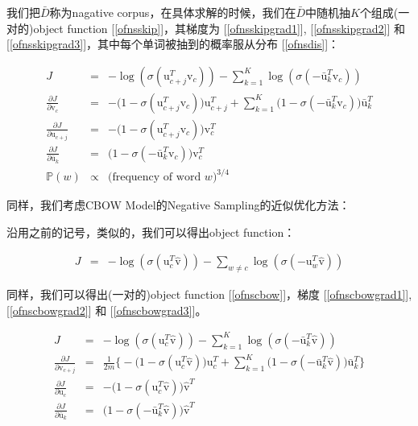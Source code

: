 \documentclass{article}
\begin{document}
我们把$\bar{D}$称为nagative corpus，在具体求解的时候，我们在$\bar{D}$中随机抽$K$个组成(一对的)object function [\ref{ofnsskip}]，其梯度为 [\ref{ofnsskipgrad1}], [\ref{ofnsskipgrad2}] 和 [\ref{ofnsskipgrad3}]，其中每个单词被抽到的概率服从分布 [\ref{ofnsdis}]：

\begin{eqnarray}
\label{ofnsskip}
J &=& -\log(\sigma(\mathrm{u}_{c+j}^T\mathrm{v}_c)) - \sum_{k=1}^K{\log(\sigma(-\bar{\mathrm{u}}_k^T\mathrm{v}_c))}\\
\label{ofnsskipgrad1}
\frac{\partial J}{\partial \mathrm{v}_c} &=& -\big(1-\sigma(\mathrm{u}_{c+j}^T\mathrm{v}_c)\big)\mathrm{u}_{c+j}^T + \sum_{k=1}^K{\big(1-\sigma(-\bar{\mathrm{u}}_k^T\mathrm{v}_c)\big)\bar{\mathrm{u}}_k^T} \\
\label{ofnsskipgrad2}
\frac{\partial J}{\partial \mathrm{u}_{c+j}} &=& -\big(1-\sigma(\mathrm{u}_{c+j}^T\mathrm{v}_c)\big)\mathrm{v}_{c}^T \\
\label{ofnsskipgrad3}
\frac{\partial J}{\partial \bar{\mathrm{u}}_k} &=& \big(1-\sigma(-\bar{\mathrm{u}}_k^T\mathrm{v}_c)\big)\mathrm{v}_{c}^T \\
\label{ofnsdis}
\mathbb{P}(w) &\propto& \big(\text{frequency of word $w$}\big)^{3/4}
\end{eqnarray}

同样，我们考虑CBOW Model的Negative Sampling的近似优化方法：

沿用之前的记号，类似的，我们可以得出object function：

\begin{eqnarray}
J &=& -\log(\sigma(\mathrm{u}_c^T\hat{\mathrm{v}})) - \sum_{w \neq c}{\log(\sigma(-\mathrm{u}_w^T\hat{\mathrm{v}}))}
\end{eqnarray}

同样，我们可以得出(一对的)object function [\ref{ofnscbow}]，梯度 [\ref{ofnscbowgrad1}], [\ref{ofnscbowgrad2}] 和 [\ref{ofnscbowgrad3}]。

\begin{eqnarray}
\label{ofnscbow}
J &=& -\log(\sigma(\mathrm{u}_c^T\hat{\mathrm{v}})) - \sum_{k=1}^K{\log(\sigma(-\bar{\mathrm{u}}_k^T\hat{\mathrm{v}}))}\\
\label{ofnscbowgrad1}
\frac{\partial J}{\partial \mathrm{v}_{c+j}} &=& \frac{1}{2m}\Big\{-\big(1-\sigma(\mathrm{u}_{c}^T\hat{\mathrm{v}})\big)\mathrm{u}_{c}^T + \sum_{k=1}^K{\big(1-\sigma(-\bar{\mathrm{u}}_k^T\hat{\mathrm{v}})\big)\bar{\mathrm{u}}_k^T}\Big\} \\
\label{ofnscbowgrad2}
\frac{\partial J}{\partial \mathrm{u}_{c}} &=& -\big(1-\sigma(\mathrm{u}_{c}^T\hat{\mathrm{v}})\big)\hat{\mathrm{v}}^T \\
\label{ofnscbowgrad3}
\frac{\partial J}{\partial \bar{\mathrm{u}}_k} &=& \big(1-\sigma(-\bar{\mathrm{u}}_k^T\hat{\mathrm{v}})\big)\hat{\mathrm{v}}^T
\end{eqnarray}
\end{document}
